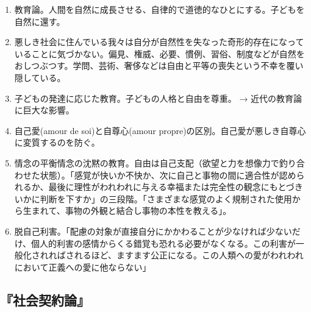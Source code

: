 \documentclass[uplatex,dvipdfmx]{jsarticle} \usepackage{mystyle}%
\begin{document}
\begin{enumerate}
\item 教育論。人間を自然に成長させる、自律的で道徳的なひとにする。子どもを自然に還す。

\item 悪しき社会に住んでいる我々は自分が自然性を失なった奇形的存在になっていることに気づかない。偏見、権威、必要、慣例、習俗、制度などが自然をおしつぶつす。学問、芸術、奢侈などは自由と平等の喪失という不幸を覆い隠している。

\item 子どもの発達に応じた教育。子どもの人格と自由を尊重。 → 近代の教育論に巨大な影響。

\item 自己愛(amour de soi)と自尊心(amour propre)の区別。自己愛が悪しき自尊心に変質するのを防ぐ。

\item 情念の平衡情念の沈黙の教育。自由は自己支配（欲望と力を想像力で釣り合わせた状態）。「感覚が快いか不快か、次に自己と事物の間に適合性が認められるか、最後に理性がわれわれに与える幸福または完全性の観念にもとづきいかに判断を下すか」の三段階。「さまざまな感覚のよく規制された使用から生まれて、事物の外観と結合し事物の本性を教える」。

\item 脱自己利害。「配慮の対象が直接自分にかかわることが少なければ少ないだけ、個人的利害の感情からくる錯覚も恐れる必要がなくなる。この利害が一般化されればされるほど、ますます公正になる。この人類への愛がわれわれにおいて正義への愛に他ならない」

\end{enumerate}


\subsection{『社会契約論』}
\end{document}
